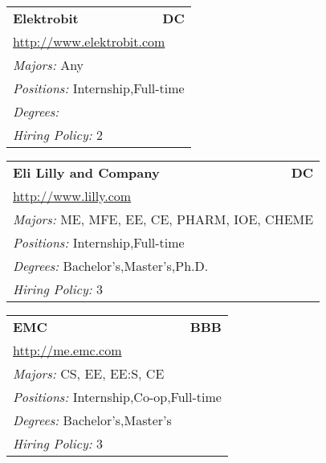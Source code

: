 \documentclass[twoside]{article}
\begin{document}
\begin{center}
\begin{multicols}{3}
\begin{FlushLeft}
\begin{minipage}{\columnwidth}
\end{minipage}
 
\begin{minipage}{\columnwidth}\begin{tabularx}{.95\columnwidth}{Xr}
                 {\Large\bf Elektrobit} & {\Large\bf DC}\\
    \multicolumn{2}{p{.95\columnwidth}}{\url{http://www.elektrobit.com}}\\
    \multicolumn{2}{p{.95\columnwidth}}{\emph{Majors:} Any}\\
    \multicolumn{2}{p{.95\columnwidth}}{\emph{Positions:} Internship,Full-time}\\
    \multicolumn{2}{p{.95\columnwidth}}{\emph{Degrees:} }\\
    \multicolumn{2}{p{.95\columnwidth}}{\emph{Hiring Policy:} 2}\\
    \end{tabularx}
    
\end{minipage}
 
\begin{minipage}{\columnwidth}\begin{tabularx}{.95\columnwidth}{Xr}
                 {\Large\bf Eli Lilly and Company} & {\Large\bf DC}\\
    \multicolumn{2}{p{.95\columnwidth}}{\url{http://www.lilly.com}}\\
    \multicolumn{2}{p{.95\columnwidth}}{\emph{Majors:} ME, MFE, EE, CE, PHARM, IOE, CHEME}\\
    \multicolumn{2}{p{.95\columnwidth}}{\emph{Positions:} Internship,Full-time}\\
    \multicolumn{2}{p{.95\columnwidth}}{\emph{Degrees:} Bachelor's,Master's,Ph.D.}\\
    \multicolumn{2}{p{.95\columnwidth}}{\emph{Hiring Policy:} 3}\\
    \end{tabularx}
    
\end{minipage}
 
\begin{minipage}{\columnwidth}\begin{tabularx}{.95\columnwidth}{Xr}
                 {\Large\bf EMC} & {\Large\bf BBB}\\
    \multicolumn{2}{p{.95\columnwidth}}{\url{http://me.emc.com}}\\
    \multicolumn{2}{p{.95\columnwidth}}{\emph{Majors:} CS, EE, EE:S, CE}\\
    \multicolumn{2}{p{.95\columnwidth}}{\emph{Positions:} Internship,Co-op,Full-time}\\
    \multicolumn{2}{p{.95\columnwidth}}{\emph{Degrees:} Bachelor's,Master's}\\
    \multicolumn{2}{p{.95\columnwidth}}{\emph{Hiring Policy:} 3}\\
    \end{tabularx}
    

\end{minipage}
\end{FlushLeft}
\end{multicols}
\end{center}
\end{document}
